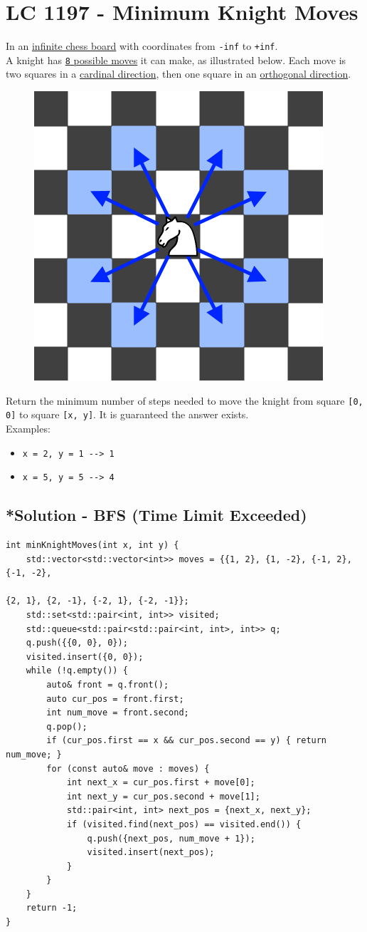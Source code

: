 \section{LC 1197 - Minimum Knight Moves}
In an \ul{infinite chess board} with coordinates from {\colorbox{CodeBackground}{\lstinline|-inf|}} to {\colorbox{CodeBackground}{\lstinline|+inf|}}. \\

A knight has \ul{{\colorbox{CodeBackground}{\lstinline|8|}} possible moves} it can make, as illustrated below. Each move is two squares in a \ul{cardinal direction}, then one square in an \ul{orthogonal direction}.

\begin{figure}[H]
\centering
\includegraphics[width=0.25\linewidth]{images/lc1197}
\label{fig:lc1197}
\end{figure}

Return the minimum number of steps needed to move the knight from square {\colorbox{CodeBackground}{\lstinline|[0, 0]|}} to square {\colorbox{CodeBackground}{\lstinline|[x, y]|}}. It is guaranteed the answer exists.\\

Examples:
\begin{itemize}
\item {\colorbox{CodeBackground}{\lstinline|x = 2, y = 1 --> 1|}}
\item {\colorbox{CodeBackground}{\lstinline|x = 5, y = 5 --> 4|}}
\end{itemize}

\subsection*{*Solution - BFS (Time Limit Exceeded)}
\begin{lstlisting}
int minKnightMoves(int x, int y) {
	std::vector<std::vector<int>> moves = {{1, 2}, {1, -2}, {-1, 2}, {-1, -2},
																				 {2, 1}, {2, -1}, {-2, 1}, {-2, -1}};
	std::set<std::pair<int, int>> visited;
	std::queue<std::pair<std::pair<int, int>, int>> q;
	q.push({{0, 0}, 0});
	visited.insert({0, 0});
	while (!q.empty()) {
		auto& front = q.front();
		auto cur_pos = front.first;
		int num_move = front.second;
		q.pop();
		if (cur_pos.first == x && cur_pos.second == y) { return num_move; }
		for (const auto& move : moves) {
			int next_x = cur_pos.first + move[0];
			int next_y = cur_pos.second + move[1];
			std::pair<int, int> next_pos = {next_x, next_y};
			if (visited.find(next_pos) == visited.end()) {
				q.push({next_pos, num_move + 1});
				visited.insert(next_pos);
			}
		}
	}
	return -1;
}
\end{lstlisting}

